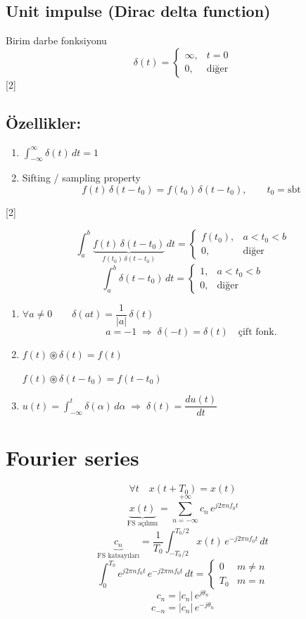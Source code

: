 \documentclass[11pt,a4paper]{article}
\begin{document}
\subsection{Unit impulse (Dirac delta function)}
Birim darbe fonksiyonu
\[ \delta(t)=\begin{cases} \infty, & t=0\\ 0, & \text{diğer} \end{cases} \]
[2]

\subsection{Özellikler:}
\begin{enumerate}[label=\arabic*)]
\item $\displaystyle\int_{-\infty}^{\infty}\delta(t)\,dt=1$
\item Sifting / sampling property
\[ f(t)\,\delta(t-t_0)=f(t_0)\,\delta(t-t_0),\qquad t_0=\text{sbt} \]
\end{enumerate}
[2]

\[ \int_a^b \underbrace{f(t)\,\delta(t-t_0)}_{f(t_0)\,\delta(t-t_0)}\,dt=\begin{cases} f(t_0), & a<t_0<b\\ 0, & \text{diğer}\end{cases} \]
\[ \int_a^b \delta(t-t_0)\,dt=\begin{cases} 1, & a<t_0<b\\ 0, & \text{diğer}\end{cases} \]
\begin{enumerate}[label=\arabic*),start=3]
\item $\forall a\neq0 \qquad \delta(at)=\dfrac{1}{|a|}\,\delta(t)$
\[ a=-1 \;\Rightarrow\; \delta(-t)=\delta(t)\quad\text{çift fonk.} \]
\item $f(t)\circledast\delta(t)=f(t)$\par
$f(t)\circledast\delta(t-t_0)=f(t-t_0)$
\item $u(t)=\displaystyle\int_{-\infty}^{t}\delta(\alpha)\,d\alpha \;\Rightarrow\; \delta(t)=\dfrac{du(t)}{dt}$
\end{enumerate}

\section{Fourier series}
\[ \forall t \quad x(t+T_0)=x(t) \]
\[ \underbrace{x(t)}_{\text{FS açılımı}}=\sum_{n=-\infty}^{+\infty} c_n\,e^{j2\pi n f_0 t} \]
\[ \underbrace{c_n}_{\text{FS katsayıları}}=\frac{1}{T_0}\int_{-T_0/2}^{T_0/2} x(t)\,e^{-j2\pi n f_0 t}\,dt \]
\[ \int_0^{T_0} e^{j2\pi n f_0 t}\,e^{-j2\pi m f_0 t}\,dt=\begin{cases} 0 & m\neq n\\ T_0 & m=n\end{cases} \]
\[ c_n=|c_n|\,e^{j\theta_n} \]
\[ c_{-n}=|c_n|\,e^{-j\theta_n} \]
\end{document}
